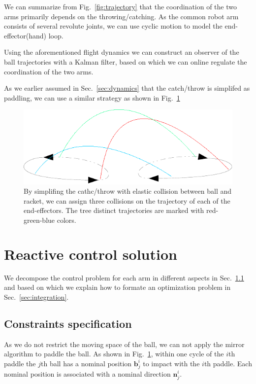\documentclass[letterpaper, 10 pt, conference]{ieeeconf}  %
\newcommand{\bs}{\boldsymbol}
\begin{document}
We can summarize from Fig.~\ref{fig:trajectory} that 
the coordination of the two arms primarily depends on the throwing/catching. As the common robot arm consists of several revolute joints, we can use cyclic motion to model the end-effector(hand) loop. 

Using the aforementioned flight dynamics we can construct an observer of the ball trajectories with a Kalman filter, based on which we can online regulate the coordination of the two arms. 


As we earlier assumed in Sec.~\ref{sec:dynamics} that the catch/throw is simplifed as paddling, we can use a similar strategy as shown in Fig.~\ref{fig:new_trajectory}  
\begin{figure}[htbp]
  \begin{center}
    \includegraphics[width=1.0\columnwidth]{fig/trajectory_new}
    \caption{By simplifing the cathc/throw with elastic collision between ball and racket, we can assign three collisions on the trajectory of each of  the end-effectors. The tree distinct trajectories are marked with red-green-blue colors.
    }
     \label{fig:new_trajectory}
  \end{center}
\end{figure}

\section{Reactive control solution}
\label{sec:control}
We decompose the control problem for each arm in different aspects in Sec.~\ref{sec:specification} and based on which we explain how to formate an optimization problem in Sec.~\ref{sec:integration}.
\subsection{Constraints specification}
\label{sec:specification}
As we do not restrict the moving space of the ball, we can not apply the  mirror algorithm \cite{buehler1994planning} to paddle the ball. 
As shown in Fig.~\ref{fig:new_trajectory}, within one cycle of the $i$th paddle the $j$th ball has a nominal position $\bs{b}^{i}_j$ to impact with the $i$th paddle.  
Each nominal position is associated with a nominal direction $\bs{n}^i_j$. 
\end{document}
